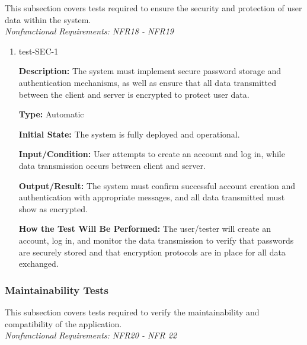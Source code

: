 \documentclass[12pt, titlepage]{article}
\begin{document}
This subsection covers tests required to ensure the security and protection of user data within the system. \\
\textit{Nonfunctional Requirements: NFR18 - NFR19}

\begin{enumerate}

\item{test-SEC-1\\}

\textbf{Description:} The system must implement secure password storage and
authentication mechanisms, as well as ensure that all data transmitted between
the client and server is encrypted to protect user data.

\textbf{Type:} Automatic
					
\textbf{Initial State:} The system is fully deployed and operational.
					
\textbf{Input/Condition:} User attempts to create an account and log in, while
data transmission occurs between client and server.
					
\textbf{Output/Result:} The system must confirm successful account creation and
authentication with appropriate messages, and all data transmitted must show as
encrypted.
					
\textbf{How the Test Will Be Performed:} The user/tester will create an account,
log in, and monitor the data transmission to verify that passwords are securely
stored and that encryption protocols are in place for all data exchanged.

\end{enumerate}

\subsubsection{Maintainability Tests}

This subsection covers tests required to verify the maintainability and compatibility of the application. \\
\textit{Nonfunctional Requirements: NFR20 - NFR 22}
\end{document}

